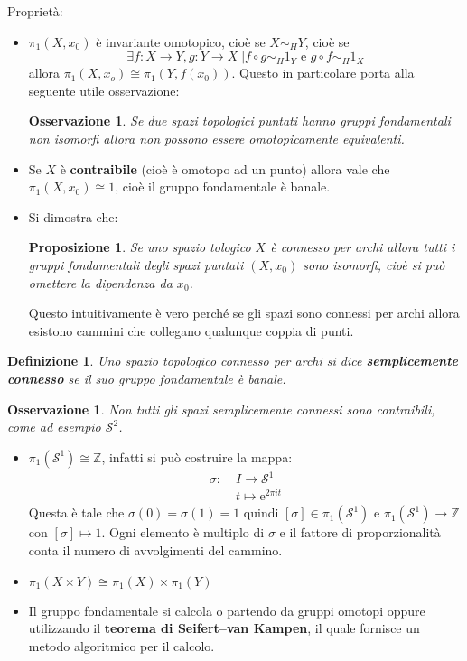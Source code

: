 \documentclass[10pt, twoside=false, x11names]{scrbook}
\newtheorem{proposition}[theorem]{Proposizione}
\newtheorem{osservation}[theorem]{Osservazione}
\newtheorem{definition}[theorem]{Definizione}
\newcommand{\Z}{\mathbb{Z}}
\newcommand{\Sph}[1][]{\mathcal{S}^#1}
\begin{document}
Proprietà:
\begin{itemize}
\item $ \pi_1(X,x_0) $ è invariante omotopico, cioè se $ X \sim_H Y $, cioè se
  \[
    \exists f: X \to Y, g: Y \to X \; | f \circ g \sim_H 1_Y \text{ e }  g \circ f \sim_H 1_X
  \]
  allora $ \pi_1(X,x_o) \cong \pi_1(Y,f(x_0)) $. Questo in particolare porta alla seguente
  utile osservazione:
  \begin{osservation}
    Se due spazi topologici puntati hanno gruppi fondamentali non isomorfi allora
    non possono essere omotopicamente equivalenti.
  \end{osservation}
\item Se $ X $ è \textbf{contraibile}  (cioè è
  omotopo ad un punto) allora vale che $ \pi_1(X,x_0) \cong 1 $, cioè il gruppo
  fondamentale è banale.
\item Si dimostra che:
  \begin{proposition}
    Se uno spazio tologico $ X $ è connesso per archi allora tutti i gruppi fondamentali
    degli spazi puntati $ (X,x_0) $ sono isomorfi, cioè si può omettere la dipendenza da $ x_0 $.
  \end{proposition}
  Questo intuitivamente è vero perché se gli spazi sono connessi per archi allora esistono cammini
  che collegano qualunque coppia di punti.
\end{itemize}

\begin{definition}
  Uno spazio topologico connesso per archi si dice \textbf{semplicemente connesso} 
  se il suo gruppo fondamentale è banale.
\end{definition}

\begin{osservation}
  Non tutti gli spazi semplicemente connessi sono contraibili, come ad esempio $ \Sph{2} $.
\end{osservation}

\begin{itemize}
\item $ \pi_1(\Sph{1}) \cong \Z $, infatti si può costruire la mappa:
  \[
    \begin{aligned}
      \sigma: &\; I \to \Sph{1} \\
      &\;  t \mapsto \mathrm{e}^{2 \pi i t}
     \end{aligned}
   \]
  Questa è tale che $ \sigma(0) = \sigma(1) = 1 $ quindi $ [\sigma] \in \pi_1(\Sph{1}) $ e $ \pi_1(\Sph{1}) \to \Z $ con $ [\sigma] \mapsto 1 $.
  Ogni elemento è multiplo di $ \sigma $ e il fattore di proporzionalità conta il numero di avvolgimenti
  del cammino.
\item $ \pi_1(X \times Y) \cong \pi_1(X) \times \pi_1(Y) $
\item Il gruppo fondamentale si calcola o partendo da gruppi omotopi oppure utilizzando il \textbf{teorema di Seifert–van Kampen}, 
  il quale fornisce un metodo algoritmico per il calcolo.
\end{itemize}
\end{document}
